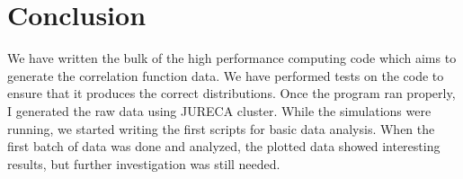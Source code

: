 
\chapter{Conclusion}
\label{sec:conclusion}


We have written the bulk of the high performance computing code which aims to generate the correlation function data. We have performed tests on the code to ensure that it produces the correct distributions. Once the program ran properly, I generated the raw data using JURECA cluster. While the simulations were running, we started writing the first scripts for basic data analysis. When the first batch of data was done and analyzed, the plotted data showed interesting results, but further investigation was still needed.

